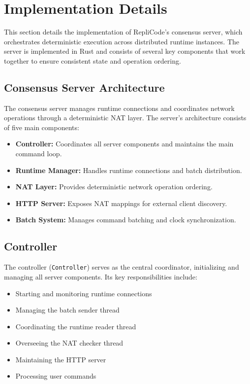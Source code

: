 \documentclass[10pt, 
]{IEEEtran}
\begin{document}
\section{Implementation Details}

This section details the implementation of RepliCode's consensus server, which orchestrates deterministic execution across distributed runtime instances. The server is implemented in Rust and consists of several key components that work together to ensure consistent state and operation ordering.

\subsection{Consensus Server Architecture}

The consensus server manages runtime connections and coordinates network operations through a deterministic NAT layer. The server's architecture consists of five main components:

\begin{itemize}
    \item \textbf{Controller:} Coordinates all server components and maintains the main command loop.
    \item \textbf{Runtime Manager:} Handles runtime connections and batch distribution.
    \item \textbf{NAT Layer:} Provides deterministic network operation ordering.
    \item \textbf{HTTP Server:} Exposes NAT mappings for external client discovery.
    \item \textbf{Batch System:} Manages command batching and clock synchronization.
\end{itemize}

\subsection{Controller}

The controller (\texttt{Controller}) serves as the central coordinator, initializing and managing all server components. Its key responsibilities include:

\begin{itemize}
    \item Starting and monitoring runtime connections
    \item Managing the batch sender thread
    \item Coordinating the runtime reader thread
    \item Overseeing the NAT checker thread
    \item Maintaining the HTTP server
    \item Processing user commands
\end{itemize}
\end{document}
